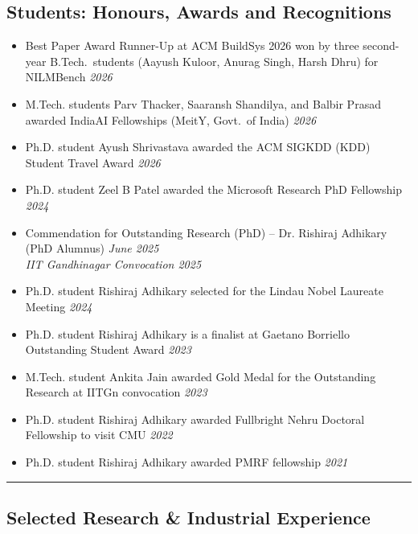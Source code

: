 \documentclass[letter,10pt]{article}
\begin{document}
\subsection*{\textbf{Students: Honours, Awards and Recognitions}}
\vspace{-0.4em}
\begin{itemize}
\item[]{Best Paper Award Runner-Up at ACM BuildSys 2026 won by three second-year B.Tech.\ students (Aayush Kuloor, Anurag Singh, Harsh Dhru) for NILMBench} \hfill\textit{2026}
\item[]{M.Tech. students Parv Thacker, Saaransh Shandilya, and Balbir Prasad awarded IndiaAI Fellowships (MeitY, Govt.\ of India)} \hfill\textit{2026}
\item[]{Ph.D. student Ayush Shrivastava awarded the ACM SIGKDD (KDD) Student Travel Award} \hfill\textit{2026}
\item[]{Ph.D. student Zeel B Patel awarded the Microsoft Research PhD Fellowship} \hfill\textit{2024}
\item[]{Commendation for Outstanding Research (PhD) – Dr. Rishiraj Adhikary (PhD Alumnus)} \hfill\textit{June 2025}\\
    \textit{IIT Gandhinagar Convocation 2025}
\item[]{Ph.D. student Rishiraj Adhikary selected for the Lindau Nobel Laureate Meeting} \hfill\textit{2024}
\item[]{Ph.D. student Rishiraj Adhikary is a finalist at Gaetano Borriello Outstanding Student Award} \hfill\textit{2023}
\item[]{M.Tech. student Ankita Jain awarded Gold Medal for the Outstanding Research at IITGn convocation} \hfill\textit{2023}
\item[]{Ph.D. student Rishiraj Adhikary awarded Fullbright Nehru Doctoral Fellowship to visit CMU} \hfill\textit{2022}
\item[]{Ph.D. student Rishiraj Adhikary awarded PMRF fellowship} \hfill\textit{2021}
   
    
\end{itemize}

\ifcvshort\else
\vspace{0.5em}
\noindent\rule{\textwidth}{0.5pt}
\vspace{-0.2em}
\fi

\subsection*{\textbf{Selected Research \& Industrial Experience}}
\vspace{-0.4em}
\end{document}
